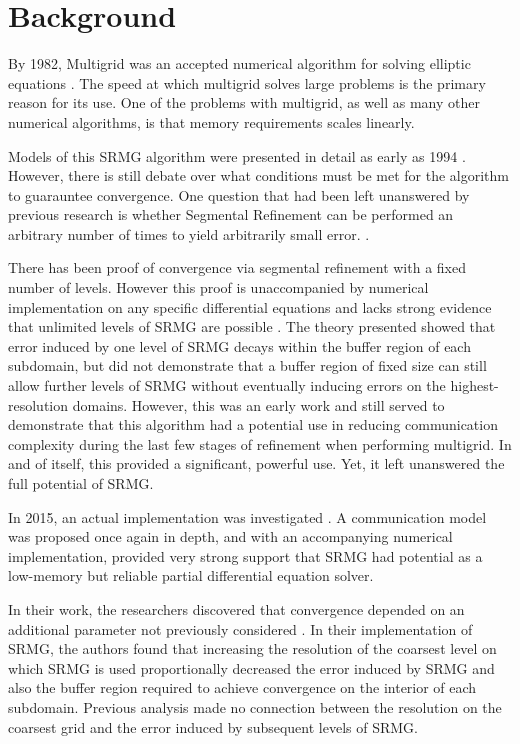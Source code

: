 \documentclass[final]{siamart1116}
\numberwithin{theorem}{section}
\begin{document}
\section{Background}\label{sec:backg}
By 1982, Multigrid was an accepted numerical algorithm for solving elliptic equations \cite{earlymulti}. The speed at which multigrid solves large problems is the primary reason for its use. One of the problems with multigrid, as well as many other numerical algorithms, is that memory requirements scales linearly. 
   
    Models of this SRMG algorithm were presented in detail as early as 1994 \cite{brandtdiskin}. However, there is still debate over what conditions must be met for the algorithm to guarauntee convergence. One question that had been left unanswered by previous research is whether Segmental Refinement can be performed an arbitrary number of times to yield arbitrarily small error. \cite{paper1}. 

	There has been proof of convergence via segmental refinement with a fixed number of levels. However this proof is unaccompanied by numerical implementation on any specific differential equations and lacks strong evidence that unlimited levels of SRMG are possible \cite{brandtdiskin}. The theory  presented showed that error induced by one level of SRMG decays within the buffer region of each subdomain, but did not demonstrate that a buffer region of fixed size can still allow further levels of SRMG  without eventually inducing errors on the highest-resolution domains. However, this was an early work and still served to demonstrate that this algorithm had a potential use in reducing communication complexity during the last few stages of refinement when performing multigrid. In and of itself, this provided a significant, powerful use. Yet, it left unanswered the full potential of SRMG.
    
   
    In 2015, an actual implementation was investigated \cite{paper1}. A communication model was proposed once again in depth, and with an accompanying numerical implementation, provided very strong support that SRMG had potential as a low-memory but reliable partial differential equation solver.
    
    In their work, the researchers discovered that convergence depended on an additional parameter not previously considered \cite{paper1}. In their  implementation of SRMG, the authors found that increasing the resolution of the coarsest level on which SRMG is used proportionally decreased the error induced by SRMG and also the buffer region required to achieve convergence on the interior of each subdomain. Previous analysis made no connection between the resolution on the coarsest grid and the error induced by subsequent levels of SRMG.
    
\end{document}
